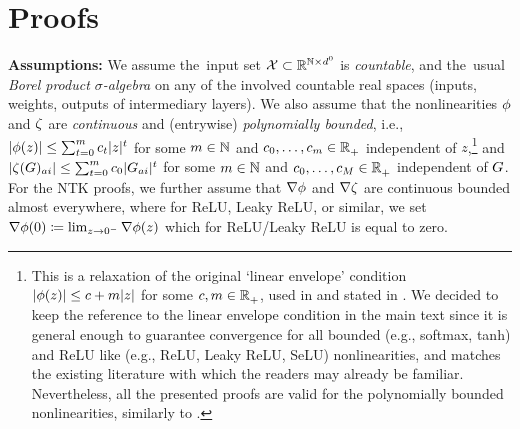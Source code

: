 \section{Proofs}\label{sect:proofs}


\textbf{Assumptions:} We assume the~input set $\mathcal{X} \subset \mathbb{R}^{\mathbb{N} \times d^{0}}$ is \emph{countable}, and
the~usual \emph{Borel product $\sigma$-algebra} on any of the involved countable real spaces (inputs, weights, outputs of intermediary layers).
We also assume that the nonlinearities $\phi$ and $\zeta$ are \emph{continuous} and (entrywise) \emph{polynomially bounded}, i.e.,
$|\phi(z)| \leq \sum_{t = 0}^{m} c_t |z|^t$ for some $m \in \mathbb{N}$ and $c_0, \ldots, c_m \in \mathbb{R}^{}_+$ independent of $z$,\footnote{This is a relaxation of the original `linear envelope' condition $|\phi(z)| \leq c + m |z|$ for some $c, m \in \mathbb{R}^{}_+$, used in \citep{matthews2018gaussian,garriga2019deep} and stated in .
We decided to keep the reference to the linear envelope condition in the main text since it is general enough to guarantee convergence for all bounded (e.g., softmax, tanh) and ReLU like (e.g., ReLU, Leaky ReLU, SeLU) nonlinearities, and matches the existing literature with which the readers may already be familiar.
Nevertheless, all the presented proofs are valid for the polynomially bounded nonlinearities, similarly to \citep{yang2019v2}.} and $|\zeta(G)_{a i}| \leq \sum_{t = 0}^m c_0 |G_{a i}|^t$ for some $m \in \mathbb{N}$ and $c_0, \ldots , c_M \in \mathbb{R}^{}_+$ independent of $G$.
For the NTK proofs, we further assume that $\nabla \phi$ and $\nabla \zeta$ are continuous bounded almost everywhere, where for ReLU, Leaky ReLU, or similar, we set $\nabla \phi(0) \coloneqq \lim_{z \to 0^-} \nabla \phi(z)$ which for ReLU/Leaky ReLU is equal to zero.


